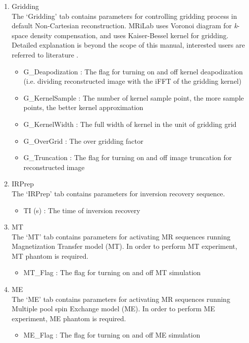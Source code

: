 \documentclass{book}%
\begin{document}
\begin{enumerate}
  \item Gridding \\
	The `Gridding' tab contains parameters for controlling gridding process in default Non-Cartesian reconstruction. MRiLab uses Voronoi diagram for \textit{k}-space density compensation, and uses Kaiser-Bessel kernel for gridding. Detailed explanation is beyond the scope of this manual, interested users are referred to literature \cite{Jackson1991,VRasche1999,Beatty2005}.
		\begin{itemize}
			\item G\_Deapodization : The flag for turning on and off kernel deapodization (i.e. dividing reconstructed image with the iFFT of the gridding kernel)
			\item G\_KernelSample : The number of kernel sample point, the more sample points, the better kernel approximation
			\item G\_KernelWidth : The full width of kernel in the unit of gridding grid
			\item G\_OverGrid : The over gridding factor
			\item G\_Truncation : The flag for turning on and off image truncation for reconstructed image
		\end{itemize}
	
	\item IRPrep \\
	The `IRPrep' tab contains parameters for inversion recovery sequence.
		\begin{itemize}
			\item TI (s) : The time of inversion recovery
		\end{itemize}
		
	\item MT \\
	The `MT' tab contains parameters for activating MR sequences running Magnetization Transfer model (MT). In order to perform MT experiment, MT phantom is required.
		\begin{itemize}
			\item MT\_Flag : The flag for turning on and off MT simulation
		\end{itemize}
		
	\item ME \\
	The `ME' tab contains parameters for activating MR sequences running Multiple pool spin Exchange model (ME). In order to perform ME experiment, ME phantom is required.
	\begin{itemize}
		\item ME\_Flag : The flag for turning on and off ME simulation
	\end{itemize}
	

\end{enumerate}
\end{document}
